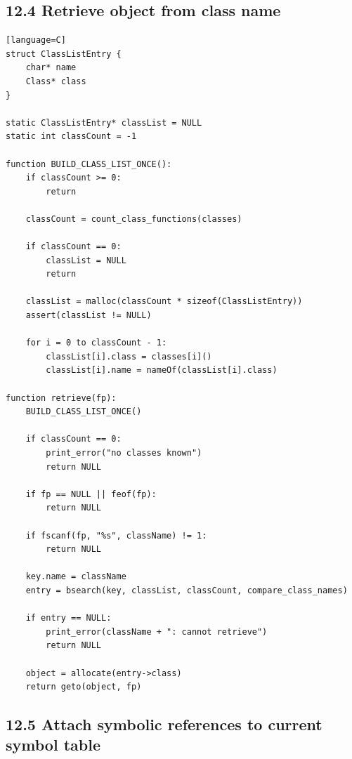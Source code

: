\documentclass[11pt]{article}
\begin{document}
\subsection{12.4 Retrieve object from class
name}\label{retrieve-object-from-class-name}

\begin{verbatim}[language=C]
struct ClassListEntry {
    char* name
    Class* class
}

static ClassListEntry* classList = NULL
static int classCount = -1

function BUILD_CLASS_LIST_ONCE():
    if classCount >= 0:
        return

    classCount = count_class_functions(classes)

    if classCount == 0:
        classList = NULL
        return

    classList = malloc(classCount * sizeof(ClassListEntry))
    assert(classList != NULL)

    for i = 0 to classCount - 1:
        classList[i].class = classes[i]()
        classList[i].name = nameOf(classList[i].class)

function retrieve(fp):
    BUILD_CLASS_LIST_ONCE()

    if classCount == 0:
        print_error("no classes known")
        return NULL

    if fp == NULL || feof(fp):
        return NULL

    if fscanf(fp, "%s", className) != 1:
        return NULL

    key.name = className
    entry = bsearch(key, classList, classCount, compare_class_names)

    if entry == NULL:
        print_error(className + ": cannot retrieve")
        return NULL

    object = allocate(entry->class)
    return geto(object, fp)
\end{verbatim}

\subsection{12.5 Attach symbolic references to current symbol
table}\label{attach-symbolic-references-to-current-symbol-table}
\end{document}
